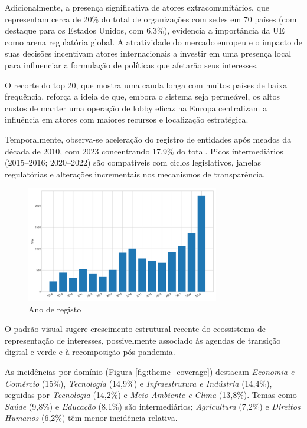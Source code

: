 Adicionalmente, a presença significativa de atores extracomunitários, que representam cerca de 20\% do total de organizações com sedes em 70 países (com destaque para os Estados Unidos, com 6,3\%), evidencia a importância da UE como arena regulatória global. A atratividade do mercado europeu e o impacto de suas decisões incentivam atores internacionais a investir em uma presença local para influenciar a formulação de políticas que afetarão seus interesses. 

O recorte do top 20, que mostra uma cauda longa com muitos países de baixa frequência, reforça a ideia de que, embora o sistema seja permeável, os altos custos de manter uma operação de lobby eficaz na Europa centralizam a influência em atores com maiores recursos e localização estratégica.

Temporalmente, observa-se aceleração do registro de entidades após meados da década de 2010, com 2023 concentrando 17,9\% do total. Picos intermediários (2015--2016; 2020--2022) são compatíveis com ciclos legislativos, janelas regulatórias e alterações incrementais nos mecanismos de transparência.

\begin{figure}[!htbp]
\centering
\includegraphics[width=0.75\textwidth]{figures/year_distribution.png}
\caption{Ano de registo}
\end{figure}

O padrão visual sugere crescimento estrutural recente do ecossistema de representação de interesses, possivelmente associado às agendas de transição digital e verde e à recomposição pós-pandemia.

As incidências por domínio (Figura \ref{fig:theme_coverage}) destacam \textit{Economia e Comércio} (15\%), \textit{Tecnologia} (14,9\%) e \textit{Infraestrutura e Indústria} (14,4\%), seguidas por \textit{Tecnologia} (14,2\%) e \textit{Meio Ambiente e Clima} (13,8\%). Temas como \textit{Saúde} (9,8\%) e \textit{Educação} (8,1\%) são intermediários; \textit{Agricultura} (7,2\%) e \textit{Direitos Humanos} (6,2\%) têm menor incidência relativa.

